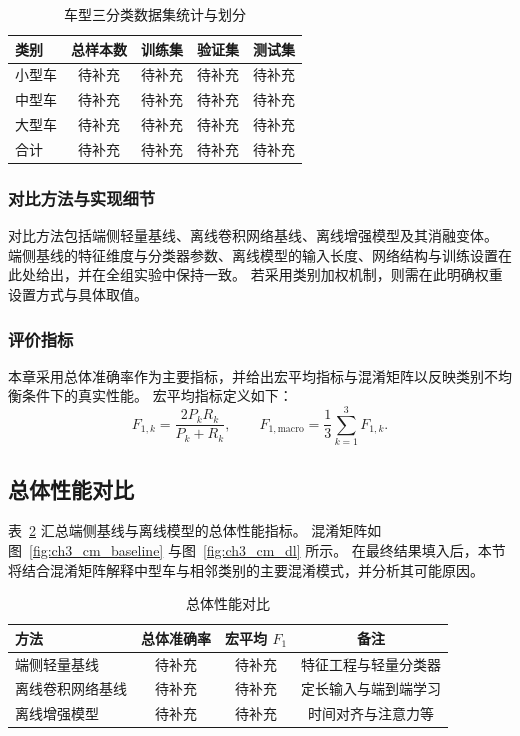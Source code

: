 \documentclass{xdupgthesis}
\begin{document}
\begin{table}[htbp]
\centering
\caption{车型三分类数据集统计与划分}
\label{tab:ch3_dataset}
\begin{tabular}{lcccc}
\hline
类别 & 总样本数 & 训练集 & 验证集 & 测试集 \\
\hline
小型车 & 待补充 & 待补充 & 待补充 & 待补充 \\
中型车 & 待补充 & 待补充 & 待补充 & 待补充 \\
大型车 & 待补充 & 待补充 & 待补充 & 待补充 \\
\hline
合计 & 待补充 & 待补充 & 待补充 & 待补充 \\
\hline
\end{tabular}
\end{table}

\subsubsection{对比方法与实现细节}
对比方法包括端侧轻量基线、离线卷积网络基线、离线增强模型及其消融变体。
端侧基线的特征维度与分类器参数、离线模型的输入长度、网络结构与训练设置在此处给出，并在全组实验中保持一致。
若采用类别加权机制，则需在此明确权重设置方式与具体取值。

\subsubsection{评价指标}
本章采用总体准确率作为主要指标，并给出宏平均指标与混淆矩阵以反映类别不均衡条件下的真实性能。
宏平均指标定义如下：
\[
F_{1,k}=\frac{2P_kR_k}{P_k+R_k},
\qquad
F_{1,\mathrm{macro}}=\frac{1}{3}\sum_{k=1}^{3}F_{1,k}.
\]

\subsection{总体性能对比}
表~\ref{tab:ch3_overall} 汇总端侧基线与离线模型的总体性能指标。
混淆矩阵如图~\ref{fig:ch3_cm_baseline} 与图~\ref{fig:ch3_cm_dl} 所示。
在最终结果填入后，本节将结合混淆矩阵解释中型车与相邻类别的主要混淆模式，并分析其可能原因。

\begin{table}[htbp]
\centering
\caption{总体性能对比}
\label{tab:ch3_overall}
\begin{tabular}{lccc}
\hline
方法 & 总体准确率 & 宏平均 $F_1$ & 备注 \\
\hline
端侧轻量基线 & 待补充 & 待补充 & 特征工程与轻量分类器 \\
离线卷积网络基线 & 待补充 & 待补充 & 定长输入与端到端学习 \\
离线增强模型 & 待补充 & 待补充 & 时间对齐与注意力等 \\
\hline
\end{tabular}
\end{table}
\end{document}
